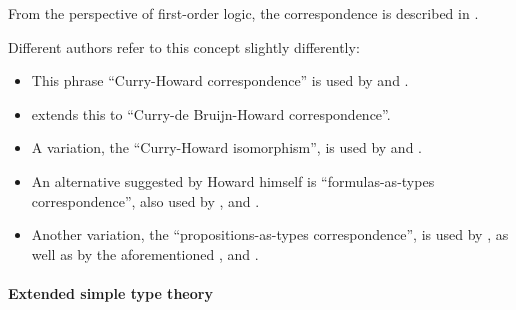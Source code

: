\begin{comments}
  \item From the perspective of first-order logic, the correspondence is described in .

  \item Different authors refer to this concept slightly differently:
  \begin{itemize}
    \item This phrase \enquote{Curry-Howard correspondence} is used by  and .

    \item {} extends this to \enquote{Curry-de Bruijn-Howard correspondence}.

    \item A variation, the \enquote{Curry-Howard isomorphism}, is used by  and .

    \item  An alternative suggested by Howard himself is \enquote{formulas-as-types correspondence}, also used by ,  and .

    \item Another variation, the \enquote{propositions-as-types correspondence}, is used by , as well as by the aforementioned ,  and .
  \end{itemize}
\end{comments}

\paragraph{Extended simple type theory}\hfill

